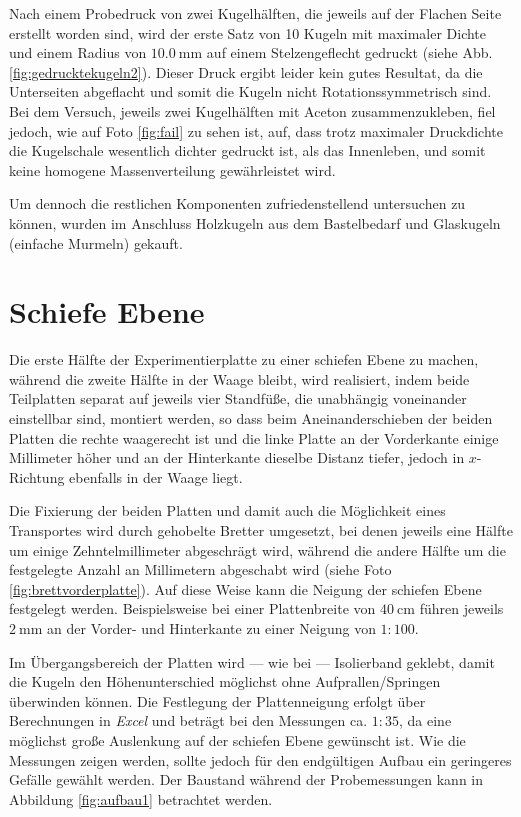 

\noindent Nach einem Probedruck von zwei Kugelhälften, die jeweils auf der Flachen Seite erstellt worden sind, wird der erste Satz von 10 Kugeln mit maximaler Dichte und einem Radius von $\SI{10.0}{\milli\metre}$ auf einem Stelzengeflecht gedruckt (siehe Abb. \ref{fig:gedrucktekugeln2}). Dieser Druck ergibt leider kein gutes Resultat, da die Unterseiten abgeflacht und somit die Kugeln nicht Rotationssymmetrisch sind. Bei dem Versuch, jeweils zwei Kugelhälften mit Aceton zusammenzukleben, fiel jedoch, wie auf Foto \ref{fig:fail} zu sehen ist, auf, dass trotz maximaler Druckdichte die Kugelschale wesentlich dichter gedruckt ist, als das Innenleben, und somit keine homogene Massenverteilung gewährleistet wird. 



\noindent Um dennoch die restlichen Komponenten zufriedenstellend untersuchen zu können, wurden im Anschluss Holzkugeln aus dem Bastelbedarf und Glaskugeln (einfache Murmeln) gekauft. 

\section{Schiefe Ebene}

Die erste Hälfte der Experimentierplatte zu einer schiefen Ebene zu machen, während die zweite Hälfte in der Waage bleibt, wird realisiert, indem beide Teilplatten separat auf jeweils vier Standfüße, die unabhängig voneinander einstellbar sind, montiert werden, so dass beim Aneinanderschieben der beiden Platten die rechte waagerecht ist und die linke Platte an der Vorderkante einige Millimeter höher und an der Hinterkante dieselbe Distanz tiefer, jedoch in $x$-Richtung ebenfalls in der Waage liegt.

Die Fixierung der beiden Platten und damit auch die Möglichkeit eines Transportes wird durch gehobelte Bretter umgesetzt, bei denen jeweils eine Hälfte um einige Zehntelmillimeter abgeschrägt wird, während die andere Hälfte um die festgelegte Anzahl an Millimetern abgeschabt wird (siehe Foto \ref{fig:brettvorderplatte}). Auf diese Weise kann die Neigung der schiefen Ebene festgelegt werden. Beispielsweise bei einer Plattenbreite von $\SI{40}{\centi\metre}$ führen jeweils $\SI{2}{\milli\metre}$ an der Vorder- und Hinterkante zu einer Neigung von $1:100$.



\noindent Im Übergangsbereich der Platten wird --- wie bei \textcite{Schilling1987} --- Isolierband geklebt, damit die Kugeln den Höhenunterschied möglichst ohne Aufprallen/Springen überwinden können. Die Festlegung der Plattenneigung erfolgt über Berechnungen in \textit{Excel} und beträgt bei den Messungen ca. $1:35$, da eine möglichst große Auslenkung auf der schiefen Ebene gewünscht ist. Wie die Messungen zeigen werden, sollte jedoch für den endgültigen Aufbau ein geringeres Gefälle gewählt werden. Der Baustand während der Probemessungen kann in Abbildung \ref{fig:aufbau1} betrachtet werden.

